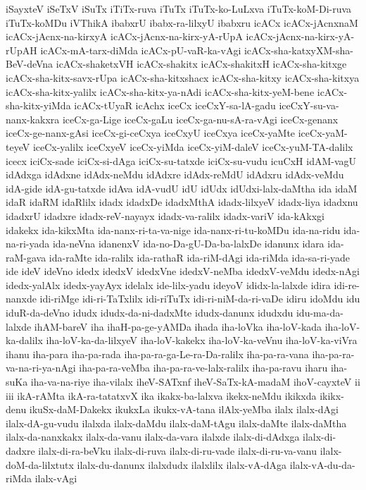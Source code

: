 {iSayxteV
iSeTxV
iSuTx
iTiTx-ruva
iTuTx
iTuTx-ko-LuLxva
iTuTx-koM-Di-ruva
iTuTx-koMDu
iVThikA
ibabxrU
ibabx-ra-lilxyU
ibabxru
icACx
icACx-jAcnxnaM
icACx-jAcnx-na-kirxyA
icACx-jAcnx-na-kirx-yA-rUpA
icACx-jAcnx-na-kirx-yA-rUpAH
icACx-mA-tarx-diMda
icACx-pU-vaR-ka-vAgi
icACx-sha-katxyXM-sha-BeV-deVna
icACx-shaketxVH
icACx-shakitx
icACx-shakitxH
icACx-sha-kitxge
icACx-sha-kitx-savx-rUpa
icACx-sha-kitxshacx
icACx-sha-kitxy
icACx-sha-kitxya
icACx-sha-kitx-yalilx
icACx-sha-kitx-ya-nAdi
icACx-sha-kitx-yeM-bene
icACx-sha-kitx-yiMda
icACx-tUyaR
icAchx
iceCx
iceCxY-sa-lA-gadu
iceCxY-su-va-nanx-kakxra
iceCx-ga-Lige
iceCx-gaLu
iceCx-ga-nu-sA-ra-vAgi
iceCx-genanx
iceCx-ge-nanx-gAsi
iceCx-gi-ceCxya
iceCxyU
iceCxya
iceCx-yaMte
iceCx-yaM-teyeV
iceCx-yalilx
iceCxyeV
iceCx-yiMda
iceCx-yiM-daleV
iceCx-yuM-TA-dalilx
icecx
iciCx-sade
iciCx-si-dAga
iciCx-su-tatxde
iciCx-su-vudu
icuCxH
idAM-vagU
idAdxga
idAdxne
idAdx-neMdu
idAdxre
idAdx-reMdU
idAdxru
idAdx-veMdu
idA-gide
idA-gu-tatxde
idAva
idA-vudU
idU
idUdx
idUdxi-lalx-daMtha
ida
idaM
idaR
idaRM
idaRlilx
idadx
idadxDe
idadxMthA
idadx-lilxyeV
idadx-liya
idadxnu
idadxrU
idadxre
idadx-reV-nayayx
idadx-va-ralilx
idadx-variV
ida-kAkxgi
idakekx
ida-kikxMta
ida-nanx-ri-ta-va-nige
ida-nanx-ri-tu-koMDu
ida-na-ridu
ida-na-ri-yada
ida-neVna
idanenxV
ida-no-Da-gU-Da-ba-lalxDe
idanunx
idara
ida-raM-gava
ida-raMte
ida-ralilx
ida-rathaR
ida-riM-dAgi
ida-riMda
ida-sa-ri-yade
ide
ideV
ideVno
idedx
idedxV
idedxVne
idedxV-neMba
idedxV-veMdu
idedx-nAgi
idedx-yalAlx
idedx-yayAyx
idelalx
ide-lilx-yadu
ideyoV
ididx-la-lalxde
idira
idi-re-nanxde
idi-riMge
idi-ri-TaTxlilx
idi-riTuTx
idi-ri-niM-da-ri-vaDe
idiru
idoMdu
idu
iduR-da-deVno
idudx
idudx-da-ni-dadxMte
idudx-danunx
idudxdu
idu-ma-da-lalxde
ihAM-bareV
iha
ihaH-pa-ge-yAMDa
ihada
iha-loVka
iha-loV-kada
iha-loV-ka-dalilx
iha-loV-ka-da-lilxyeV
iha-loV-kakekx
iha-loV-ka-veVnu
iha-loV-ka-viVra
ihanu
iha-para
iha-pa-rada
iha-pa-ra-ga-Le-ra-Da-ralilx
iha-pa-ra-vana
iha-pa-ra-va-na-ri-ya-nAgi
iha-pa-ra-veMba
iha-pa-ra-ve-lalx-ralilx
iha-pa-ravu
iharu
iha-suKa
iha-va-na-riye
iha-vilalx
iheV-SATxnf
iheV-SaTx-kA-madaM
ihoV-cayxteV
ii
iii
ikA-rAMta
ikA-ra-tatatxvX
ika
ikakx-ba-lalxva
ikekx-neMdu
ikikxda
ikikx-denu
ikuSx-daM-Dakekx
ikukxLa
ikukx-vA-tana
ilAlx-yeMba
ilalx
ilalx-dAgi
ilalx-dA-gu-vudu
ilalxda
ilalx-daMdu
ilalx-daM-tAgu
ilalx-daMte
ilalx-daMtha
ilalx-da-nanxkakx
ilalx-da-vanu
ilalx-da-vara
ilalxde
ilalx-di-dAdxga
ilalx-di-dadxre
ilalx-di-ra-beVku
ilalx-di-ruva
ilalx-di-ru-vade
ilalx-di-ru-va-vanu
ilalx-doM-da-lilxtutx
ilalx-du-danunx
ilalxdudx
ilalxlilx
ilalx-vA-dAga
ilalx-vA-du-da-riMda
ilalx-vAgi
}
